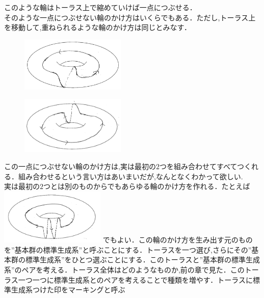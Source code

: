 このような輪はトーラス上で縮めていけば一点につぶせる．\\
そのような一点につぶせない輪のかけ方はいくらでもある．ただし,トーラス上を移動して,重ねられるような輪のかけ方は同じとみなす．\\
\begin{figure}[h]
\begin{minipage}{0.5\hsize}
\includegraphics[width=5cm]{asaka12.png}\\
\end{minipage}
\begin{minipage}{0.5\hsize}
\includegraphics[width=5cm]{asaka121.png}\\
\end{minipage}
\end{figure}
この一点につぶせない輪のかけ方は,実は最初の$2$つを組み合わせてすべてつくれる．組み合わせるという言い方はあいまいだが,なんとなくわかって欲しい.\\
実は最初の$2$つとは別のものからでもあらゆる輪のかけ方を作れる．たとえば\\
\includegraphics[width=5cm]{asaka14.png}
でもよい．この輪のかけ方を生み出す元のものを”基本群の標準生成系”と呼ぶことにする．トーラスを一つ選び,さらにその”基本群の標準生成系”をひとつ選ぶことにする．このトーラスと”基本群の標準生成系”のペアを考える．トーラス全体はどのようなものか,前の章で見た．このトーラス一つ一つに標準生成系とのペアを考えることで種類を増やす．トーラスに標準生成系つけた印をマーキングと呼ぶ\\
